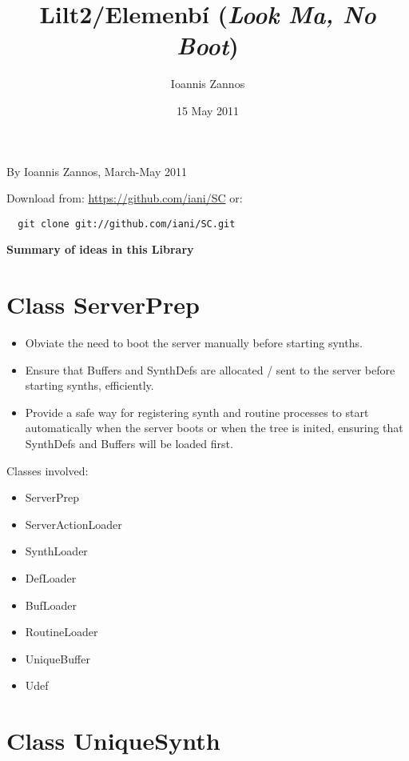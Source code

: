 \documentclass[11pt]{article}
\begin{document}
\title{Lilt2/Elemenb\'i (\emph{Look Ma, No Boot})}
\author{Ioannis Zannos}
\date{15 May 2011}
\maketitle

\setcounter{tocdepth}{3}
\tableofcontents
\vspace*{1cm}

By Ioannis Zannos, March-May 2011

Download from: \href{https://github.com/iani/SC}{https://github.com/iani/SC}
or:
\begin{verbatim}
  git clone git://github.com/iani/SC.git
\end{verbatim}


\textbf{Summary of ideas in this Library}


\section{Class ServerPrep}
\label{sec-1}


\begin{itemize}
\item Obviate the need to boot the server manually before starting synths.
\item Ensure that Buffers and SynthDefs are allocated / sent to the server
  before starting synths, efficiently.
\item Provide a safe way for registering synth and routine processes to start automatically when the server boots
  or when the tree is inited, ensuring that SynthDefs and Buffers will be loaded first.
\end{itemize}

Classes involved: 

\begin{itemize}
\item ServerPrep
\item ServerActionLoader
\item SynthLoader
\item DefLoader
\item BufLoader
\item RoutineLoader
\item UniqueBuffer
\item Udef
\end{itemize}
\section{Class UniqueSynth}
\label{sec-2}
\end{document}
